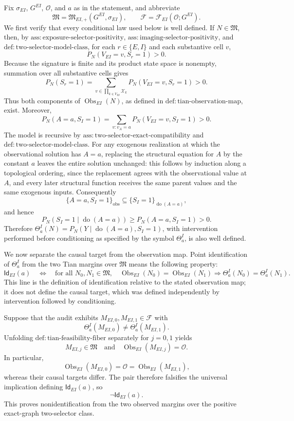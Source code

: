 Fix \(\sigma_{EI}\), \(G^{EI}\), \(\mathcal O\), and \(a\) as in the statement, and abbreviate
\[
 \mathfrak M=\mathfrak M_{EI,+}(G^{EI},\sigma_{EI}),
 \qquad
 \mathcal F=\mathcal F_{EI}(\mathcal O;G^{EI}).
\]
We first verify that every conditional law used below is well defined.  If \(N\in\mathfrak M\), then, by \(\mathrm{ass:exposure\text{-}selector\text{-}positivity}\), \(\mathrm{ass:imaging\text{-}selector\text{-}positivity}\), and \(\mathrm{def:two\text{-}selector\text{-}model\text{-}class}\), for each \(r\in\{E,I\}\) and each substantive cell \(v\),
\[
 P_N(V_{EI}=v,S_r=1)>0.
\]
Because the signature is finite and its product state space is nonempty, summation over all substantive cells gives
\[
 P_N(S_r=1)
 =\sum_{v\in\prod_{k\in V_{EI}}\mathcal X_k}
   P_N(V_{EI}=v,S_r=1)>0.
\]
Thus both components of \(\operatorname{Obs}_{EI}(N)\), as defined in \(\mathrm{def:tian\text{-}observation\text{-}map}\), exist.  Moreover,
\[
 P_N(A=a,S_I=1)
 =\sum_{v:v_A=a}P_N(V_{EI}=v,S_I=1)>0.
\]
The model is recursive by \(\mathrm{ass:two\text{-}selector\text{-}exact\text{-}compatibility}\) and \(\mathrm{def:two\text{-}selector\text{-}model\text{-}class}\).  For any exogenous realization at which the observational solution has \(A=a\), replacing the structural equation for \(A\) by the constant \(a\) leaves the entire solution unchanged: this follows by induction along a topological ordering, since the replacement agrees with the observational value at \(A\), and every later structural function receives the same parent values and the same exogenous inputs.  Consequently
\[
 \{A=a,S_I=1\}_{\mathrm{obs}}
 \subseteq
 \{S_I=1\}_{\operatorname{do}(A=a)},
\]
and hence
\[
 P_N(S_I=1\mid\operatorname{do}(A=a))
 \ge P_N(A=a,S_I=1)>0.
\]
Therefore \(\Theta^I_a(N)=P_N(Y\mid\operatorname{do}(A=a),S_I=1)\), with intervention performed before conditioning as specified by the symbol \(\Theta^I_a\), is also well defined.

We now separate the causal target from the observation map.  Point identification of \(\Theta^I_a\) from the two Tian margins over \(\mathfrak M\) means the following property:
\[
 \mathsf{Id}_{EI}(a)
 \quad\Longleftrightarrow\quad
 \text{for all }N_0,N_1\in\mathfrak M,
 \quad
 \operatorname{Obs}_{EI}(N_0)=\operatorname{Obs}_{EI}(N_1)
 \Longrightarrow
 \Theta^I_a(N_0)=\Theta^I_a(N_1).
\]
This line is the definition of identification relative to the stated observation map; it does not define the causal target, which was defined independently by intervention followed by conditioning.

Suppose that the audit exhibits \(M_{EI,0},M_{EI,1}\in\mathcal F\) with
\[
 \Theta^I_a(M_{EI,0})\ne\Theta^I_a(M_{EI,1}).
\]
Unfolding \(\mathrm{def:tian\text{-}feasibility\text{-}fiber}\) separately for \(j=0,1\) yields
\[
 M_{EI,j}\in\mathfrak M
 \quad\text{and}\quad
 \operatorname{Obs}_{EI}(M_{EI,j})=\mathcal O.
\]
In particular,
\[
 \operatorname{Obs}_{EI}(M_{EI,0})
 =\mathcal O
 =\operatorname{Obs}_{EI}(M_{EI,1}),
\]
whereas their causal targets differ.  The pair therefore falsifies the universal implication defining \(\mathsf{Id}_{EI}(a)\), so
\[
 \neg\mathsf{Id}_{EI}(a).
\]
This proves nonidentification from the two observed margins over the positive exact-graph two-selector class.

